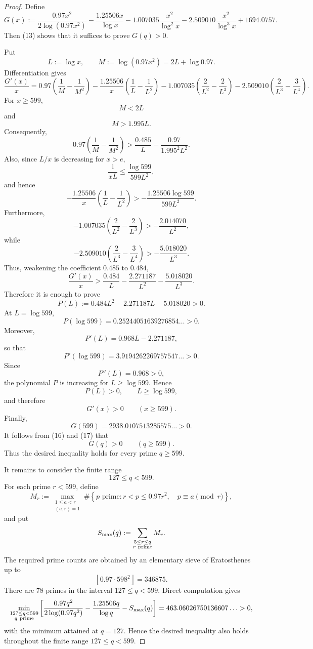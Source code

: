 \documentclass[11pt,a4paper]{article}
\theoremstyle{definition}
\theoremstyle{remark}
\begin{document}
\begin{proof}
Define
\[
G(x):=
\frac{0.97x^2}{2\log(0.97x^2)}
-\frac{1.25506x}{\log x}
-
1.007035\frac{x^2}{\log^2x}
-
2.509010\frac{x^2}{\log^3x}
+1694.0757.
\]
Then (13) shows that it suffices to prove $G(q)>0$.

Put
\[
L:=\log x,
\qquad
M:=\log(0.97x^2)=2L+\log0.97.
\]
Differentiation gives
\[
\frac{G'(x)}x
=
0.97\left(\frac1M-\frac1{M^2}\right)
-\frac{1.25506}{x}
\left(\frac1L-\frac1{L^2}\right)
-
1.007035
\left(\frac2{L^2}-\frac2{L^3}\right)
-
2.509010
\left(\frac2{L^3}-\frac3{L^4}\right).
\tag{14}
\]
For $x\ge599$,
\[
M<2L
\]
and
\[
M>1.995L.
\]
Consequently,
\[
0.97\left(\frac1M-\frac1{M^2}\right)
>
\frac{0.485}{L}
-\frac{0.97}{1.995^2L^2}.
\]
Also, since $L/x$ is decreasing for $x>e$,
\[
\frac1{xL}
\le
\frac{\log599}{599L^2},
\]
and hence
\[
-\frac{1.25506}{x}
\left(\frac1L-\frac1{L^2}\right)
>
-\frac{1.25506\log599}{599L^2}.
\]
Furthermore,
\[
-1.007035
\left(\frac2{L^2}-\frac2{L^3}\right)
>
-\frac{2.014070}{L^2},
\]
while
\[
-2.509010
\left(\frac2{L^3}-\frac3{L^4}\right)
>
-\frac{5.018020}{L^3}.
\]
Thus, weakening the coefficient $0.485$ to $0.484$,
\[
\frac{G'(x)}x
>
\frac{0.484}{L}
-\frac{2.271187}{L^2}
-\frac{5.018020}{L^3}.
\]
Therefore it is enough to prove
\[
P(L):=
0.484L^2
-2.271187L
-5.018020
>0.
\tag{15}
\]
At $L=\log599$,
\[
P(\log599)
=
0.25244051639276854\ldots
>0.
\]
Moreover,
\[
P'(L)
=
0.968L-2.271187,
\]
so that
\[
P'(\log599)
=
3.9194262269757547\ldots
>0.
\]
Since
\[
P''(L)=0.968>0,
\]
the polynomial $P$ is increasing for $L\ge\log599$. Hence
\[
P(L)>0,
\qquad L\ge\log599,
\]
and therefore
\[
G'(x)>0
\qquad(x\ge599).
\tag{16}
\]
Finally,
\[
G(599)
=
2938.0107513285575\ldots
>0.
\tag{17}
\]
It follows from (16) and (17) that
\[
G(q)>0
\qquad(q\ge599).
\]
Thus the desired inequality holds for every prime $q\ge599$.

It remains to consider the finite range
\[
127\le q<599.
\]
For each prime $r<599$, define
\[
M_r
:=
\max_{\substack{1\le a<r\\(a,r)=1}}
\#\left\{
p\text{ prime}:
r<p\le0.97r^2,\quad
p\equiv a\pmod r
\right\},
\]
and put
\[
S_{\max}(q)
:=
\sum_{\substack{5\le r\le q\\r\ {\rm prime}}}M_r.
\]
The required prime counts are obtained by an elementary sieve of
Eratosthenes up to
\[
\left\lfloor0.97\cdot598^2\right\rfloor
=
346875.
\]
There are $78$ primes in the interval $127\le q<599$. Direct
computation gives
\[
\min_{\substack{127\le q<599\\q\ {\rm prime}}}
\left[
\frac{0.97q^2}{2\log(0.97q^2)}
-\frac{1.25506q}{\log q}
-S_{\max}(q)
\right]
=
463.06026750136607\ldots
>0,
\]
with the minimum attained at $q=127$. Hence the desired inequality also
holds throughout the finite range $127\le q<599$.


\end{proof}
\end{document}
